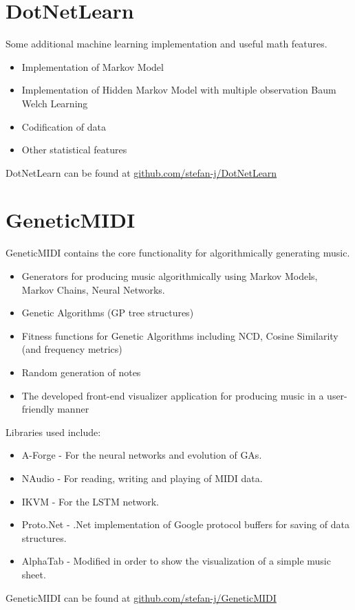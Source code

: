 \section{DotNetLearn}
Some additional machine learning implementation and useful math features.
\begin{itemize}
\item Implementation of Markov Model
\item Implementation of Hidden Markov Model with multiple observation Baum Welch Learning
\item Codification of data
\item Other statistical features
\end{itemize}
DotNetLearn can be found at \href{https://github.com/stefan-j/DotNetLearn}{github.com/stefan-j/DotNetLearn}

\section{GeneticMIDI}
GeneticMIDI contains the core functionality for algorithmically generating music.
\begin{itemize}
\item Generators for producing music algorithmically using Markov Models, Markov Chains, Neural Networks.
\item Genetic Algorithms (\ac{GP} tree structures)
\item Fitness functions for Genetic Algorithms including \ac{NCD}, Cosine Similarity (and frequency metrics)
\item Random generation of notes
\item The developed front-end visualizer application for producing music in a user-friendly manner
\end{itemize}

Libraries used include:
\begin{itemize}
\item A-Forge - For the neural networks and evolution of \acp{GA}.
\item NAudio - For reading, writing and playing of \ac{MIDI} data. 
\item IKVM - For the \ac{LSTM} network.
\item Proto.Net - .Net implementation of Google protocol buffers for saving of data structures.
\item AlphaTab - Modified in order to show the visualization of a simple music sheet.
\end{itemize}

GeneticMIDI can be found at \href{https://github.com/stefan-j/GeneticMIDI}{github.com/stefan-j/GeneticMIDI}

